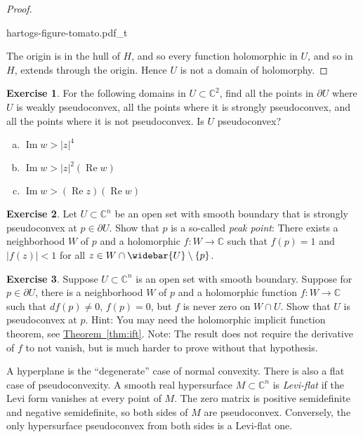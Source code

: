 \documentclass[12pt,openany]{book}
\renewcommand{\Re}{\operatorname{Re}}
\renewcommand{\Im}{\operatorname{Im}}
\newcommand{\sabs}[1]{\lvert {#1} \rvert}
\newcommand{\C}{{\mathbb{C}}}
\newcommand{\myindex}[1]{#1\index{#1}}
\theoremstyle{plain}
\theoremstyle{remark}
\theoremstyle{definition}
\newenvironment{exbox}{%
    \def\FrameCommand{\vrule width 1pt \relax\hspace{10pt}}%
    \MakeFramed {\advance \hsize -\width \FrameRestore}%
}{%
    \endMakeFramed
}
\newenvironment{exparts}{%
    \leavevmode\begin{enumerate}[a),noitemsep,topsep=0pt,parsep=0pt,partopsep=0pt]
}{%
    \end{enumerate}
}
\newenvironment{myfig}{%
    \begin{center}
}{%
    \end{center}
}
\theoremstyle{exercise}
\newtheorem{exercise}{Exercise}[section]
\theoremstyle{example}
\newcommand{\thmref}[1]{\hyperref[#1]{Theorem~\ref*{#1}}}
\begin{document}
\begin{proof}
\begin{myfig}
{hartogs-figure-tomato.pdf_t}
\end{myfig}

The origin is in the hull of $H$, and so
every function holomorphic in $U$, and so in $H$, extends through the origin.
Hence $U$ is not a domain of holomorphy.
\end{proof}

\begin{exbox}
\begin{exercise}
\pagebreak[2]
For the following domains in $U \subset \C^2$,
find all the
points in $\partial U$ where $U$ is weakly pseudoconvex, all the points
where it is strongly pseudoconvex, and all the points where it is
not pseudoconvex.  Is $U$ pseudoconvex?
\begin{exparts}
\item
$\Im w > \sabs{z}^4$
\item
$\Im w > \sabs{z}^2(\Re w)$
\item
$\Im w > (\Re z)(\Re w)$
\pagebreak[2]
\end{exparts}
\end{exercise}

\begin{exercise}
Let $U \subset \C^n$ be an open set with smooth boundary that is
strongly pseudoconvex at $p \in \partial U$.  Show that
$p$ is a so-called \emph{\myindex{peak point}}: There
exists a neighborhood $W$ of $p$ and a holomorphic $f \colon
W \to \C$ 
such that $f(p)=1$ and $\sabs{f(z)} < 1$ for all
$z \in W \cap \widebar{U} \setminus \{ p \}$.
\end{exercise}

\begin{exercise}
Suppose $U \subset \C^n$ is an open set with smooth boundary.  Suppose
for $p \in \partial U$, there is a neighborhood $W$ of $p$
and a holomorphic function $f \colon W \to
\C$ such that $df(p) \not= 0$, $f(p) = 0$, but
$f$ is never zero on $W \cap U$.  Show that $U$ is pseudoconvex
at $p$.  Hint: You may need the holomorphic implicit function theorem, see
\thmref{thm:ift}.
Note: The result does not require the derivative of $f$ to not vanish, but is
much harder to prove without that hypothesis.
\end{exercise}
\end{exbox}

A hyperplane is the ``degenerate'' case of normal convexity.
There is also a flat case of pseudoconvexity.  A smooth real hypersurface
$M \subset \C^n$ is \emph{\myindex{Levi-flat}} if the Levi form
vanishes at every point of $M$.  The zero matrix is positive semidefinite
and negative semidefinite, so both sides of $M$ are pseudoconvex.
Conversely, the only hypersurface pseudoconvex from both sides is a
Levi-flat one.
\end{document}
